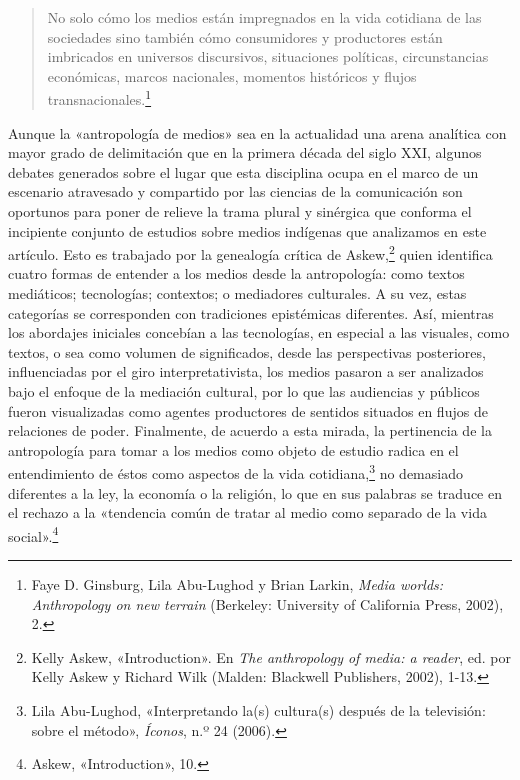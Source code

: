 \documentclass{tufte-handout}
\begin{document}
\begin{quote}
No solo cómo los medios están impregnados en la vida cotidiana de las
sociedades sino también cómo consumidores y productores están imbricados
en universos discursivos, situaciones políticas, circunstancias
económicas, marcos nacionales, momentos históricos y flujos
transnacionales.\footnote{Faye D. Ginsburg, Lila Abu-Lughod y Brian
  Larkin, \emph{Media worlds: Anthropology on new terrain} (Berkeley:
  University of California Press, 2002), 2.}
\end{quote}

\noindent Aunque la «antropología de medios» sea en la actualidad una arena
analítica con mayor grado de delimitación que en la primera década del
siglo XXI, algunos debates generados sobre el lugar que esta disciplina
ocupa en el marco de un escenario atravesado y compartido por las
ciencias de la comunicación son oportunos para poner de relieve la trama
plural y sinérgica que conforma el incipiente conjunto de estudios sobre
medios indígenas que analizamos en este artículo. Esto es trabajado por
la genealogía crítica de Askew,\footnote{Kelly Askew, «Introduction». En
  \emph{The anthropology of media: a reader}, ed. por Kelly Askew y
  Richard Wilk (Malden: Blackwell Publishers, 2002), 1-13.} quien
identifica cuatro formas de entender a los medios desde la antropología:
como textos mediáticos; tecnologías; contextos; o mediadores culturales.
A su vez, estas categorías se corresponden con tradiciones epistémicas
diferentes. Así, mientras los abordajes iniciales concebían a las
tecnologías, en especial a las visuales, como textos, o sea como volumen
de significados, desde las perspectivas posteriores, influenciadas por
el giro interpretativista, los medios pasaron a ser analizados bajo el
enfoque de la mediación cultural, por lo que las audiencias y públicos
fueron visualizadas como agentes productores de sentidos situados en
flujos de relaciones de poder. Finalmente, de acuerdo a esta mirada, la
pertinencia de la antropología para tomar a los medios como objeto de
estudio radica en el entendimiento de éstos como aspectos de la vida
cotidiana,\footnote{Lila Abu-Lughod, «Interpretando la(s) cultura(s)
  después de la televisión: sobre el método», \emph{Íconos}, n.º 24
  (2006).} no demasiado diferentes a la ley, la economía o la religión,
lo que en sus palabras se traduce en el rechazo a la «tendencia común de
tratar al medio como separado de la vida social».\footnote{Askew,
  «Introduction», 10.}

\enlargethispage{\baselineskip}
\end{document}
